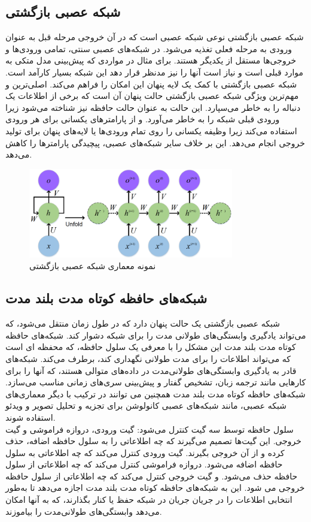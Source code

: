 \subsection{شبکه عصبی بازگشتی}
شبکه عصبی بازگشتی  نوعی شبکه عصبی است که در آن خروجی مرحله قبل به عنوان ورودی به مرحله فعلی تغذیه می‌شود. در شبکه‌های عصبی سنتی، تمامی ورودی‌ها و خروجی‌ها مستقل از یکدیگر 
هستند. برای مثال در مواردی که پیش‌بینی مدل متکی به موارد قبلی است و نیاز است آنها را نیز مدنظر قرار دهد این شبکه بسیار کارآمد است. شبکه عصبی بازگشتی با کمک یک لایه پنهان این امکان را فراهم می‌کند. اصلی‌ترین و مهم‌ترین 
ویژگی شبکه عصبی بازگشتی حالت پنهان آن است که برخی از اطلاعات یک دنباله را به خاطر می‌سپارد. این حالت به عنوان حالت حافظه نیز شناخته می‌شود زیرا ورودی قبلی شبکه را به خاطر می‌آورد. و از پارامترهای یکسانی برای هر 
ورودی استفاده می‌کند زیرا وظیفه یکسانی را روی تمام ورودی‌ها یا لایه‌های پنهان برای تولید خروجی انجام می‌دهد. این بر خلاف سایر شبکه‌های عصبی، پیچیدگی پارامترها را کاهش می‌دهد.


\begin{figure}[h]
    \centering
    \includegraphics[width=0.8\textwidth]{RNN.png}
    \caption{نمونه معماری شبکه عصبی بازگشتی}
\end{figure}

\subsection{شبکه‌های حافظه کوتاه مدت بلند مدت}
شبکه عصبی بازگشتی یک حالت پنهان دارد که در طول زمان منتقل می‌شود، که می‌تواند یادگیری وابستگی‌های طولانی مدت را برای شبکه دشوار کند. شبکه‌های حافظه کوتاه مدت بلند مدت این مشکل را با معرفی یک سلول حافظه، که محفظه 
ای است که می‌تواند اطلاعات را برای مدت طولانی نگهداری کند، برطرف می‌کند. شبکه‌های  قادر به یادگیری وابستگی‌های طولانی‌مدت در داده‌های متوالی هستند، که آنها را برای کارهایی مانند ترجمه زبان، تشخیص گفتار و پیش‌بینی 
سری‌های زمانی مناسب می‌سازد. شبکه‌های حافظه کوتاه مدت بلند مدت همچنین می توانند در ترکیب با دیگر معماری‌های شبکه عصبی، مانند شبکه‌های عصبی کانولوشن برای تجزیه و تحلیل تصویر و ویدئو استفاده شوند.
\\
سلول حافظه توسط سه گیت کنترل می‌شود: گیت ورودی، دروازه فراموشی و گیت خروجی. این گیت‌ها تصمیم می‌گیرند که چه اطلاعاتی را به سلول حافظه اضافه، حذف کرده و از آن خروجی بگیرند. گیت ورودی کنترل می‌کند که چه اطلاعاتی 
به سلول حافظه اضافه می‌شود. دروازه فراموشی کنترل می‌کند که چه اطلاعاتی از سلول حافظه حذف می‌شود. و گیت خروجی کنترل می‌کند که چه اطلاعاتی از سلول حافظه خروجی می‌ شود.
این به شبکه‌های حافظه کوتاه مدت بلند مدت اجازه می‌دهد تا به‌طور انتخابی اطلاعات را در جریان جریان در شبکه حفظ یا کنار بگذارند، که به آنها امکان می‌دهد وابستگی‌های طولانی‌مدت را بیاموزند.

